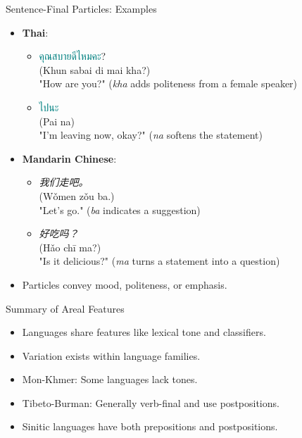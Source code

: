 \documentclass{beamer}
\newcommand{\mtplain}[1]{\textcolor{teal}{#1}}
\newcommand{\tha}[1]{\mtplain{\textthai{#1}}}
\begin{document}
\begin{frame}{Sentence-Final Particles: Examples}
    \begin{itemize}
        \item \textbf{Thai}:
            \begin{itemize}
                \item \tha{คุณสบายดีไหมคะ}? \\
                (Khun sabai di mai kha?) \\
                "How are you?" (\textit{kha} adds politeness from a female speaker)
                \item \tha{ไปนะ} \\
                (Pai na) \\
                "I'm leaving now, okay?" (\textit{na} softens the statement)
            \end{itemize}
        \item \textbf{Mandarin Chinese}:
            \begin{itemize}
                \item \textit{我们走吧。} \\
                (Wǒmen zǒu ba.) \\
                "Let's go." (\textit{ba} indicates a suggestion)
                \item \textit{好吃吗？} \\
                (Hǎo chī ma?) \\
                "Is it delicious?" (\textit{ma} turns a statement into a question)
            \end{itemize}
        \item Particles convey mood, politeness, or emphasis.
    \end{itemize}
\end{frame}

\begin{frame}{Summary of Areal Features}
    \begin{itemize}
        \item Languages share features like lexical tone and classifiers.
        \item Variation exists within language families.
        \item Mon-Khmer: Some languages lack tones.
        \item Tibeto-Burman: Generally verb-final and use postpositions.
        \item Sinitic languages have both prepositions and postpositions.
    \end{itemize}
\end{frame}
\end{document}
